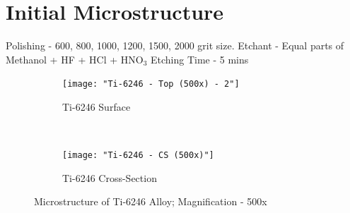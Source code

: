 \documentclass[11pt,letterpaper]{article}
\newcommand{\workingDate}{\textsc{2017 $|$ August $|$ 11}}
\begin{document}
\newpage
\renewcommand{\workingDate}{\textsc{2017 $|$ August $|$ 14}}
\section*{Initial Microstructure}
Polishing - 600, 800, 1000, 1200, 1500, 2000 grit size.
Etchant - Equal parts of Methanol + HF + HCl + HNO$_{3}$
Etching Time - 5 mins

\begin{figure}[H]
    \centering
    \begin{subfigure}{0.49\textwidth}
        \texttt{[image: "Ti-6246 - Top (500x) - 2"]}
        \caption{Ti-6246 Surface}
        \label{fig:2a}
    \end{subfigure}
    ~
    \begin{subfigure}{0.49\textwidth}
        \texttt{[image: "Ti-6246 - CS (500x)"]}
        \caption{Ti-6246 Cross-Section}
        \label{fig:2b}
    \end{subfigure}
    \caption{Microstructure of Ti-6246 Alloy; Magnification - 500x}
    \label{fig:As-Received}
\end{figure}
\end{document}

